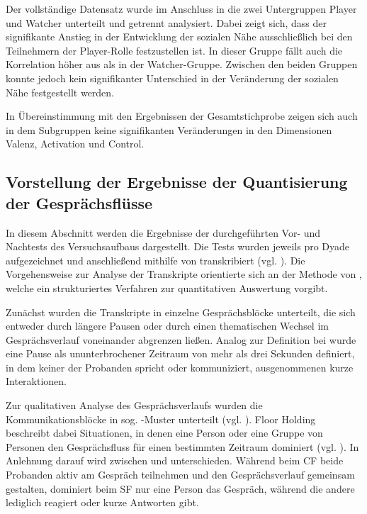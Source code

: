 Der vollständige Datensatz wurde im Anschluss in die zwei Untergruppen Player und Watcher unterteilt und getrennt analysiert. Dabei zeigt sich, dass der signifikante Anstieg in der Entwicklung der sozialen Nähe ausschließlich bei den Teilnehmern der Player-Rolle festzustellen ist. In dieser Gruppe fällt auch die Korrelation höher aus als in der Watcher-Gruppe. Zwischen den beiden Gruppen konnte jedoch kein signifikanter Unterschied in der Veränderung der sozialen Nähe festgestellt werden.

In Übereinstimmung mit den Ergebnissen der Gesamtstichprobe zeigen sich auch in dem Subgruppen keine signifikanten Veränderungen in den Dimensionen Valenz, Activation und Control.

\subsection{Vorstellung der Ergebnisse der Quantisierung der Gesprächsflüsse}

In diesem Abschnitt werden die Ergebnisse der durchgeführten Vor- und Nachtests des Versuchsaufbaus dargestellt. Die Tests wurden jeweils pro Dyade aufgezeichnet und anschließend mithilfe von  transkribiert (vgl. \citealp{bain_whisperx_2023}). Die Vorgehensweise zur Analyse der Transkripte orientierte sich an der Methode von \cite{nasir_effect_2015}, welche ein strukturiertes Verfahren zur quantitativen Auswertung vorgibt.

Zunächst wurden die Transkripte in einzelne Gesprächsblöcke unterteilt, die sich entweder durch längere Pausen oder durch einen thematischen Wechsel im Gesprächsverlauf voneinander abgrenzen ließen. Analog zur Definition bei \citeauthor{nasir_effect_2015} wurde eine Pause als ununterbrochener Zeitraum von mehr als drei Sekunden definiert, in dem keiner der Probanden spricht oder kommuniziert, ausgenommenen kurze Interaktionen.

Zur qualitativen Analyse des Gesprächsverlaufs wurden die Kommunikationsblöcke in sog.  -Muster unterteilt (vgl. \citealp{edelsky_whos_1981}). Floor Holding beschreibt dabei Situationen, in denen eine Person oder eine Gruppe von Personen den Gesprächsfluss für einen bestimmten Zeitraum dominiert (vgl. \citealp[S. 135]{nasir_effect_2015}). In Anlehnung darauf wird zwischen  und   unterschieden. Während beim \ac{CF} beide Probanden aktiv am Gespräch teilnehmen und den Gesprächsverlauf gemeinsam gestalten, dominiert beim \ac{SF} nur eine Person das Gespräch, während die andere lediglich reagiert oder kurze Antworten gibt.

